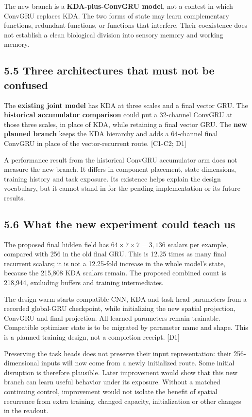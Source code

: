 \documentclass[
  11pt,
]{article}
\let\oldsubsection\subsection
\renewcommand{\subsection}{\Needspace{6\baselineskip}\oldsubsection}
\begin{document}
The new branch is a \textbf{KDA-plus-ConvGRU model}, not a contest in
which ConvGRU replaces KDA. The two forms of state may learn
complementary functions, redundant functions, or functions that
interfere. Their coexistence does not establish a clean biological
division into sensory memory and working memory.

\subsection{5.5 Three architectures that must not be
confused}\label{three-architectures-that-must-not-be-confused}

The \textbf{existing joint model} has KDA at three scales and a final
vector GRU. The \textbf{historical accumulator comparison} could put a
32-channel ConvGRU at those three scales, in place of KDA, while
retaining a final vector GRU. The \textbf{new planned branch} keeps the
KDA hierarchy and adds a 64-channel final ConvGRU in place of the
vector-recurrent route. {[}C1-C2; D1{]}

A performance result from the historical ConvGRU accumulator arm does
not measure the new branch. It differs in component placement, state
dimensions, training history and task exposure. Its existence helps
explain the design vocabulary, but it cannot stand in for the pending
implementation or its future results.

\subsection{5.6 What the new experiment could teach
us}\label{what-the-new-experiment-could-teach-us}

The proposed final hidden field has \(64\times7\times7=3,136\) scalars
per example, compared with 256 in the old final GRU. This is 12.25 times
as many final recurrent scalars; it is not a 12.25-fold increase in the
whole model's state, because the 215,808 KDA scalars remain. The
proposed combined count is 218,944, excluding buffers and training
intermediates.

The design warm-starts compatible CNN, KDA and task-head parameters from
a recorded global-GRU checkpoint, while initializing the new spatial
projection, ConvGRU and final projection. All learned parameters remain
trainable. Compatible optimizer state is to be migrated by parameter
name and shape. This is a planned training design, not a completion
receipt. {[}D1{]}

Preserving the task heads does not preserve their input representation:
their 256-dimensional inputs will now come from a newly initialized
route. Some initial disruption is therefore plausible. Later improvement
would show that this new branch can learn useful behavior under its
exposure. Without a matched continuing control, improvement would not
isolate the benefit of spatial recurrence from extra training, changed
capacity, initialization or other changes in the readout.
\end{document}
